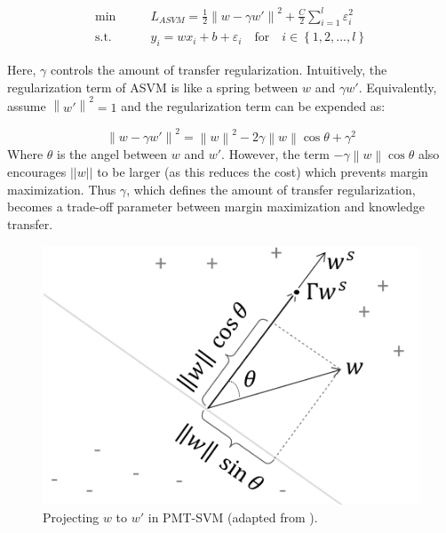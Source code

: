 \begin{equation}\label{eq:gama:asvm}
\begin{aligned}
\min \qquad& L_{ASVM} = \frac{1}{2}{\left\| w - \gamma w' \right\|^2} + \frac{C}{2}\sum\limits_{i = 1}^l {{\varepsilon_i ^2}}\\
\text{s.t.}\qquad&{y_i} = w{x_i} + b + {\varepsilon _i} \quad   \text{for} \quad i \in \left\{ {1,2,...,l} \right\}
\end{aligned}
\end{equation}

Here, $\gamma$ controls the amount of transfer regularization. Intuitively, the regularization term of ASVM is like a spring between $w$ and $\gamma w'$. Equivalently, assume ${\left\| {w'} \right\|^2}=1$ and the regularization term can be expended as:

\begin{equation*}
{\left\| {w - \gamma w'} \right\|^2} = {\left\| w \right\|^2} - 2\gamma \left\| w \right\|\cos \theta  + {\gamma ^2}
\end{equation*}
Where $\theta$ is the angel between $w$ and $w'$. However, the term $-\gamma \left\| w \right\|\cos \theta$ also encourages $||w||$
to be larger (as this reduces the cost) which prevents margin maximization. Thus $\gamma$, which defines the amount of transfer regularization, becomes a trade-off parameter between margin maximization and knowledge transfer.

\begin{figure}
\centering
\includegraphics[scale=.6]{transfer/fig/pmt-svm.png}
\caption{Projecting $w$ to $w'$ in PMT-SVM (adapted from \cite{aytar2011tabula}).}\label{fig:gama:pmt}
\end{figure}

